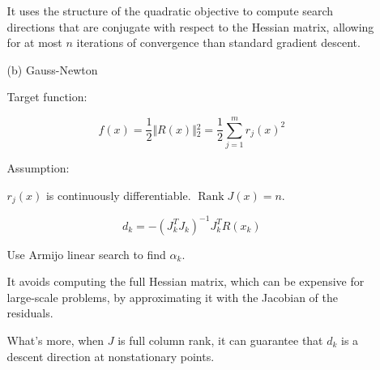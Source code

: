 \documentclass[11pt,a4paper]{article}
\begin{document}
\begin{enumerate}
\begin{enumerate}
        It uses the structure of the quadratic objective to compute search directions that are conjugate with respect to the Hessian matrix, allowing for at most $n$ iterations of convergence than standard gradient descent.

        \item[(b)] Gauss-Newton
        
        Target function:    
    
        $$
        f(x) = \frac{1}{2} \Vert{}R(x)\Vert{}_2^2 = \frac{1}{2} \sum_{j=1}^m r_j(x)^2
        $$

        Assumption:

        $r_j(x)$ is continuously differentiable. $\operatorname{Rank}{J(x)} = n$.

        $$
        d_k = -(J_k^T J_k)^{-1} J_k^T R(x_k)
        $$

        Use Armijo linear search to find $\alpha_k$.

        It avoids computing the full Hessian matrix, which can be expensive for large-scale problems, by approximating it with the Jacobian of the residuals.

        What's more, when $J$ is full column rank, it can guarantee that $d_k$ is a descent direction at nonstationary points.
    \end{enumerate}
\end{enumerate}
\end{document}
